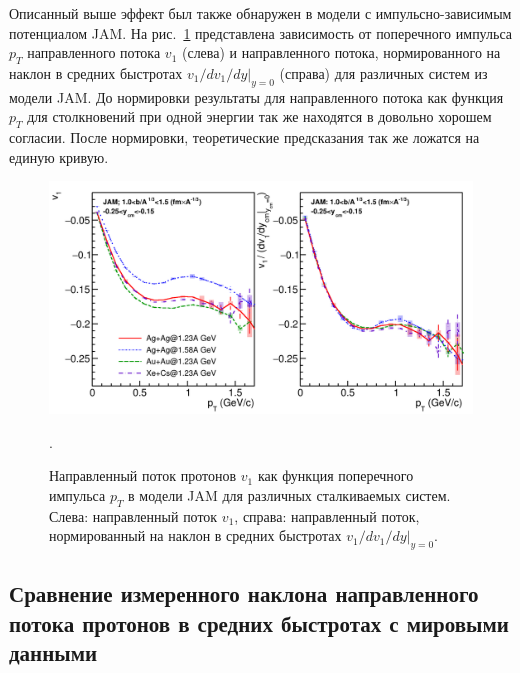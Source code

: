 Описанный выше эффект был также обнаружен в модели с импульсно-зависимым потенциалом JAM.
На рис.~\ref{fig:v1_model_pT_scaling} представлена зависимость от поперечного импульса $p_T$ направленного потока $v_1$ (слева) и направленного потока, нормированного на наклон в средних быстротах $v_1/dv_1/dy|_{y=0}$ (справа) для различных систем из модели JAM.
До нормировки результаты для направленного потока как функция $p_T$ для столкновений при одной энергии так же находятся в довольно хорошем согласии.
После нормировки, теоретические предсказания так же ложатся на единую кривую. 
\begin{figure}[ht]
\begin{center}
\includegraphics[width=0.9\linewidth]{images/v1_hades_model_pT_scaling.png}
\caption{ 
    Направленный поток протонов $v_1$ как функция поперечного импульса $p_T$ в модели JAM для различных сталкиваемых систем. Слева: направленный поток $v_1$, справа: направленный поток, нормированный на наклон в средних быстротах $v_1/dv_1/dy|_{y=0}$.
}.
\label{fig:v1_model_pT_scaling}
\end{center}
\end{figure}

\subsection{Сравнение измеренного наклона направленного потока протонов в средних быстротах с мировыми данными}

